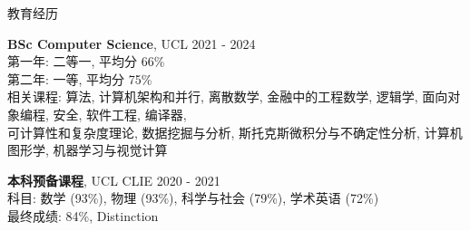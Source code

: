 \documentclass{resume_cn} %
\begin{document}
\begin{rSection}{教育经历}

{\bf BSc Computer Science}, UCL \hfill {2021 - 2024}\\
第一年: 二等一, 平均分 66\% \\
第二年: 一等, 平均分 75\% \\
相关课程: 算法, 计算机架构和并行, 离散数学, 金融中的工程数学, 逻辑学, 面向对象编程, 安全, 软件工程, 编译器, \\
可计算性和复杂度理论, 数据挖掘与分析, 斯托克斯微积分与不确定性分析, 计算机图形学, 机器学习与视觉计算

{\bf 本科预备课程}, UCL CLIE \hfill {2020 - 2021}\\
科目: 数学 (93\%), 物理 (93\%), 科学与社会 (79\%), 学术英语 (72\%)\\
最终成绩: 84\%, Distinction

\end{rSection}
\end{document}
